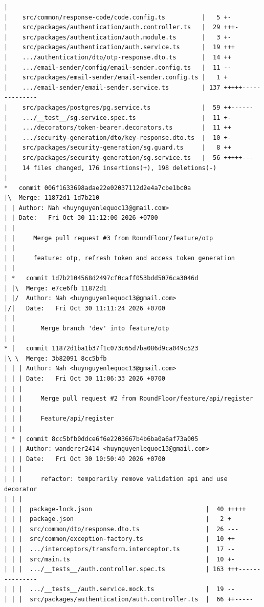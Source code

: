 \documentclass[12pt]{article}
\begin{document}
\begin{lstlisting}[numbers=none,breaklines=true]
|
|    src/common/response-code/code.config.ts          |   5 +-
|    src/packages/authentication/auth.controller.ts   |  29 +++-
|    src/packages/authentication/auth.module.ts       |   3 +-
|    src/packages/authentication/auth.service.ts      |  19 +++
|    .../authentication/dto/otp-response.dto.ts       |  14 ++
|    .../email-sender/config/email-sender.config.ts   |  11 --
|    src/packages/email-sender/email-sender.config.ts |   1 +
|    .../email-sender/email-sender.service.ts         | 137 +++++--------------
|    src/packages/postgres/pg.service.ts              |  59 ++------
|    .../__test__/sg.service.spec.ts                  |  11 +-
|    .../decorators/token-bearer.decorators.ts        |  11 ++
|    .../security-generation/dto/key-response.dto.ts  |  10 +-
|    src/packages/security-generation/sg.guard.ts     |   8 ++
|    src/packages/security-generation/sg.service.ts   |  56 +++++---
|    14 files changed, 176 insertions(+), 198 deletions(-)
|
*   commit 006f1633698adae22e02037112d2e4a7cbe1bc0a
|\  Merge: 11872d1 1d7b210
| | Author: Nah <huynguyenlequoc13@gmail.com>
| | Date:   Fri Oct 30 11:12:00 2026 +0700
| |
| |     Merge pull request #3 from RoundFloor/feature/otp
| |
| |     feature: otp, refresh token and access token generation
| |
| *   commit 1d7b2104568d2497cf0caff053bdd5076ca3046d
| |\  Merge: e7ce6fb 11872d1
| |/  Author: Nah <huynguyenlequoc13@gmail.com>
|/|   Date:   Fri Oct 30 11:11:24 2026 +0700
| |
| |       Merge branch 'dev' into feature/otp
| |
* |   commit 11872d1ba1b37f1c073c65d7ba086d9ca049c523
|\ \  Merge: 3b82091 8cc5bfb
| | | Author: Nah <huynguyenlequoc13@gmail.com>
| | | Date:   Fri Oct 30 11:06:33 2026 +0700
| | |
| | |     Merge pull request #2 from RoundFloor/feature/api/register
| | |
| | |     Feature/api/register
| | |
| * | commit 8cc5bfb0ddce6f6e2203667b4b6ba0a6af73a005
| | | Author: wanderer2414 <huynguyenlequoc13@gmail.com>
| | | Date:   Fri Oct 30 10:50:40 2026 +0700
| | |
| | |     refactor: temporarily remove validation api and use decorator
| | |
| | |  package-lock.json                               |  40 +++++
| | |  package.json                                    |   2 +
| | |  src/common/dto/response.dto.ts                  |  26 ---
| | |  src/common/exception-factory.ts                 |  10 ++
| | |  .../interceptors/transform.interceptor.ts       |  17 --
| | |  src/main.ts                                     |  10 +-
| | |  .../__tests__/auth.controller.spec.ts           | 163 +++---------------
| | |  .../__tests__/auth.service.mock.ts              |  19 --
| | |  src/packages/authentication/auth.controller.ts  |  66 ++-----

\end{lstlisting}
\end{document}
